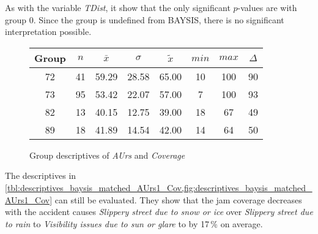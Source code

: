 As with the variable \textit{TDist}, it show that the only significant $p$-values are with group 0. Since the group is undefined from BAYSIS, there is no significant interpretation possible.
\begin{figure}[ht!]
	\centering
	\begin{minipage}{0.5\textwidth}
		\tiny
		\setlength{\tabcolsep}{4pt}
		\centering
		\begin{tabular}{c|c|c|c|c|c|c|c}
			\toprule
			Group & $n$ & $\bar{x}$ & $\sigma$ & $\tilde{x}$ & $min$ & $max$ & $\Delta$ \\
			\midrule
			72 & 41 & 59.29 & 28.58 & 65.00 & 10 & 100 & 90 \\ 
			73 & 95 & 53.42 & 22.07 & 57.00 & 7  & 100 & 93 \\ 
			82 & 13 & 40.15 & 12.75 & 39.00 & 18 & 67  & 49 \\ 
			89 & 18 & 41.89 & 14.54 & 42.00 & 14 & 64  & 50 \\ 
			\bottomrule
		\end{tabular}
		\label{tbl:descriptives_baysis_matched_AUrs1_Cov}
	\end{minipage}%
	\begin{minipage}{0.55\textwidth}
		\data 
        \pgfplotstablesort[sort key=mean, sort cmp=float >]{\datasorted}{\data}
        \tiny
        \centering
		\label{fig:descriptives_baysis_matched_AUrs1_Cov}
	\end{minipage}%
	\caption{Group descriptives of \textit{AUrs} and \textit{Coverage}}
\end{figure}
The descriptives in \cref{tbl:descriptives_baysis_matched_AUrs1_Cov,fig:descriptives_baysis_matched_AUrs1_Cov} can still be evaluated. They show that the jam coverage decreases with the accident causes \textit{Slippery street due to snow or ice} over \textit{Slippery street due to rain} to \textit{Visibility issues due to sun or glare} to by 17\,\% on average.

